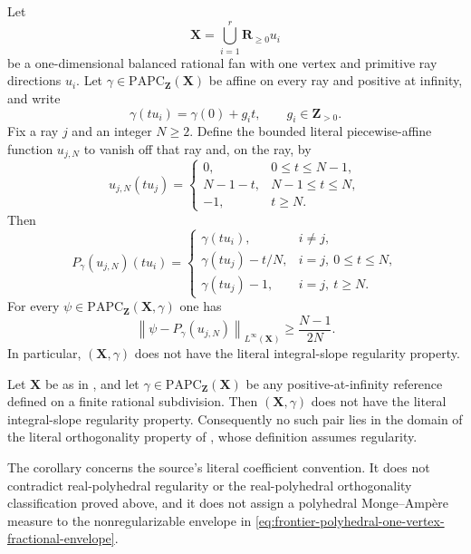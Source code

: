 
\begin{theorem}
\label{thm:frontier-polyhedral-one-vertex-integral-nonregularity}
Let
\[
                  \mathbf X=\bigcup_{i=1}^r\mathbf R_{\geq0}u_i
\]
be a one-dimensional balanced rational fan with one vertex and primitive ray
directions $u_i$.  Let
$\gamma\in\mathrm{PAPC}_{\mathbf Z}(\mathbf X)$ be affine on every ray and
positive at infinity, and write
\[
                   \gamma(tu_i)=\gamma(0)+g_i t,
                   \qquad g_i\in\mathbf Z_{>0}.
\]
Fix a ray $j$ and an integer $N\geq2$.  Define the bounded literal
piecewise-affine function $u_{j,N}$ to vanish off that ray and, on the ray,
by
\[
 u_{j,N}(tu_j)=
 \begin{cases}
  0,&0\leq t\leq N-1,\\
  N-1-t,&N-1\leq t\leq N,\\
  -1,&t\geq N.
 \end{cases}
\]
Then
\begin{equation}
\label{eq:frontier-polyhedral-one-vertex-fractional-envelope}
 P_\gamma(u_{j,N})(tu_i)=
 \begin{cases}
  \gamma(tu_i),&i\neq j,\\
  \gamma(tu_j)-t/N,&i=j,\ 0\leq t\leq N,\\
  \gamma(tu_j)-1,&i=j,\ t\geq N.
 \end{cases}
\end{equation}
For every
$\psi\in\mathrm{PAPC}_{\mathbf Z}(\mathbf X,\gamma)$ one has
\[
 \left\lVert\psi-P_\gamma(u_{j,N})\right\rVert_{L^\infty(\mathbf X)}
 \geq\frac{N-1}{2N}.
\]
In particular, $(\mathbf X,\gamma)$ does not have the literal
integral-slope regularity property.
\end{theorem}

\begin{corollary}
\label{cor:frontier-polyhedral-one-vertex-integral-nonregularity}
Let $\mathbf X$ be as in
, and let
$\gamma\in\mathrm{PAPC}_{\mathbf Z}(\mathbf X)$ be any positive-at-infinity
reference defined on a finite rational subdivision.  Then
$(\mathbf X,\gamma)$ does not have the literal integral-slope regularity
property.  Consequently no such pair lies in the domain of the literal
orthogonality property of \cite[Definition~6.9]{BMPS26}, whose definition
assumes regularity.
\end{corollary}

The corollary concerns the source's literal coefficient convention.  It does
not contradict real-polyhedral regularity or the real-polyhedral
orthogonality classification proved above, and it does not assign a
polyhedral Monge--Amp\`ere measure to the nonregularizable envelope in
\eqref{eq:frontier-polyhedral-one-vertex-fractional-envelope}.
